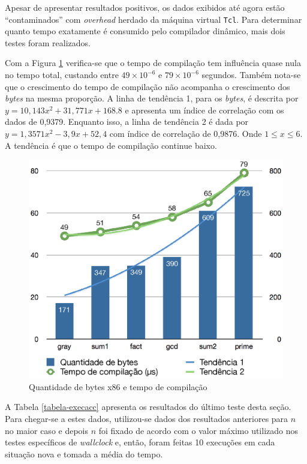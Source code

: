 Apesar de apresentar resultados positivos, os dados exibidos até
agora estão ``contaminados'' com \textit{overhead} herdado da
máquina virtual \texttt{Tcl}. Para determinar quanto tempo exatamente
é consumido pelo compilador dinâmico, mais dois testes foram
realizados.

Com a Figura \ref{fig:tempo-compilacao} verifica-se que o tempo de
compilação tem influência quase nula no tempo total, custando entre
$49 \times 10^{-6}$ e $79 \times 10^{-6}$ segundos. Também nota-se que
o crescimento do tempo de compilação não acompanha o crescimento dos
\textit{bytes} na mesma proporção.
A linha de tendência 1, para os \textit{bytes}, é
descrita por $y = 10,143x^2 + 31,771x + 168.8$ e apresenta um índice
de correlação com os dados de 0,9379. Enquanto isso, a linha de
tendência 2 é dada por $y = 1,3571x^2 - 3,9x + 52,4$ com índice de
correlação de 0,9876. Onde $1 \le x \le 6$. A tendência é que o tempo
de compilação continue baixo.

\begin{figure}[ht]
  \centering
  \includegraphics[scale=0.71]{figs/tempo_compilacao}
  \caption{Quantidade de bytes x86 e tempo de compilação \label{fig:tempo-compilacao}}
\end{figure}

A Tabela \ref{tabela-execacc} apresenta os resultados do último teste
desta seção. Para chegar-se a estes dados, utilizou-se dados dos
resultados anteriores para $n$ no maior caso e depois $n$ foi fixado
de acordo com o valor máximo utilizado nos testes específicos de
\textit{wallclock} e, então, foram feitas 10 execuções em cada
situação nova e tomada a média do tempo.

